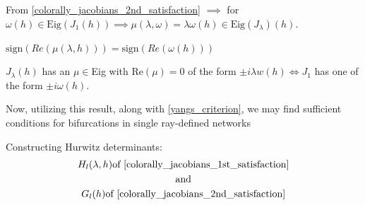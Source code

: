  From \ref{colorally_jacobians_2nd_satisfaction} $\implies$ for $\omega(h) \in \text{Eig}(J_1(h)) \implies \mu(\lambda, \omega) = \lambda \omega(h) \in \text{Eig}(J_\lambda)(h)$.

 $\mathrm{sign}(Re(\mu(\lambda,h)))=\mathrm{sign}(Re(\omega(h)))$

 $J_\lambda(h)$ has an $\mu \in$Eig with Re$(\mu) = 0$ of the form $\pm i \lambda w(h) \iff J_1$ has one of the form $\pm i \omega (h)$.

Now, utilizing this result, along with \ref{yangs_criterion}, we may find sufficient conditions for bifurcations in single ray-defined networks

Constructing Hurwitz determinants:
\begin{gather*}
	H_l(\lambda, h) \text{of \ref{colorally_jacobians_1st_satisfaction}} \\
	\text{and} \\
	G_l(h) \text{of \ref{colorally_jacobians_2nd_satisfaction}}
\end{gather*}

